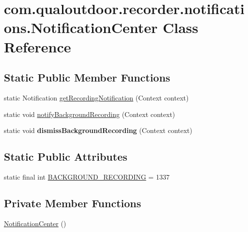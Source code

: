 \hypertarget{classcom_1_1qualoutdoor_1_1recorder_1_1notifications_1_1NotificationCenter}{\section{com.\-qualoutdoor.\-recorder.\-notifications.\-Notification\-Center Class Reference}
\label{classcom_1_1qualoutdoor_1_1recorder_1_1notifications_1_1NotificationCenter}
}
\subsection*{Static Public Member Functions}
\begin{DoxyCompactItemize}
\item 
static Notification \hyperlink{classcom_1_1qualoutdoor_1_1recorder_1_1notifications_1_1NotificationCenter_a594d7753e910b1eb8782e2e8a3601ae1}{get\-Recording\-Notification} (Context context)
\item 
static void \hyperlink{classcom_1_1qualoutdoor_1_1recorder_1_1notifications_1_1NotificationCenter_a42f3211ad67cfa311b3d5d81f31f370f}{notify\-Background\-Recording} (Context context)
\item 
\hypertarget{classcom_1_1qualoutdoor_1_1recorder_1_1notifications_1_1NotificationCenter_ad0032647617b97a891df182533d8fb5c}{static void {\bfseries dismiss\-Background\-Recording} (Context context)}\label{classcom_1_1qualoutdoor_1_1recorder_1_1notifications_1_1NotificationCenter_ad0032647617b97a891df182533d8fb5c}

\end{DoxyCompactItemize}
\subsection*{Static Public Attributes}
\begin{DoxyCompactItemize}
\item 
static final int \hyperlink{classcom_1_1qualoutdoor_1_1recorder_1_1notifications_1_1NotificationCenter_a1316ea946cb84d237c20e491c363cd33}{B\-A\-C\-K\-G\-R\-O\-U\-N\-D\-\_\-\-R\-E\-C\-O\-R\-D\-I\-N\-G} = 1337
\end{DoxyCompactItemize}
\subsection*{Private Member Functions}
\begin{DoxyCompactItemize}
\item 
\hyperlink{classcom_1_1qualoutdoor_1_1recorder_1_1notifications_1_1NotificationCenter_a212d336ad0b5722e951904316b793b78}{Notification\-Center} ()
\end{DoxyCompactItemize}


